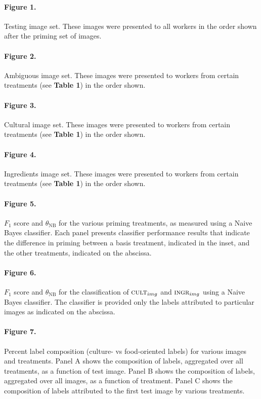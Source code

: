 \documentclass[a4paper]{report}
\begin{document}
\paragraph{Figure 1.}
	Testing image set. These images were presented to all workers in the order 
	shown after the priming set of images. 

\paragraph{Figure 2.}
	Ambiguous image set. These images were presented to workers from certain
	treatments (see \textbf{Table 1}) in the order shown.  

\paragraph{Figure 3.}
	Cultural image set. These images were presented to workers from certain
	treatments (see \textbf{Table 1}) in the order shown.  

\paragraph{Figure 4.}
	Ingredients image set. These images were presented to workers from certain
	treatments (see \textbf{Table 1}) in the order shown.  

\paragraph{Figure 5.}
$F_1$ score and $\theta_\text{NB}$ for the various 
priming treatments, as measured using a Naive Bayes classifier. Each panel 
presents classifier performance results that indicate the difference in
priming between a basis 
treatment, indicated in the inset, and the other treatments, indicated on the
abscissa.

\paragraph{Figure 6.}
$F_1$ score and $\theta_\text{NB}$ for the classification of 
$\textsc{cult}_{img}$ and $\textsc{ingr}_{img}$ using a Naive Bayes 
classifier.  The classifier is provided only the labels attributed to
particular images as indicated on the abscissa.

\paragraph{Figure 7.}
Percent label composition (culture- vs food-oriented labels) for 
various images and treatments.  Panel A shows the composition of 
labels, aggregated over all treatments, as a function of test image.
Panel B shows the composition of labels, aggregated over all images, as
a function of treatment.  Panel C shows the composition of labels 
attributed to the first test image by various treatments.
\end{document}
